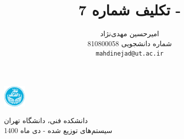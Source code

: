 \documentclass{article}
\title{تکلیف شماره 7
 - 
 \lr{Mutual Exclusion}}
\author{%
  امیرحسین مهدی‌نژاد\\
  شماره دانشجویی 810800058\\
  \texttt{mahdinejad@ut.ac.ir} \\
}
\begin{document}
\begin{minipage}{0.1\textwidth}%
\includegraphics[width=1.1cm]{Photos/UT_logo.png}
\end{minipage}%
\hfill%
\begin{minipage}{0.9\textwidth}\raggedleft
دانشکده فنی، دانشگاه تهران\\
سیستم‌های توزیع شده - 
دی
ماه 1400\\
\end{minipage}

\makepertitle

\end{document}

